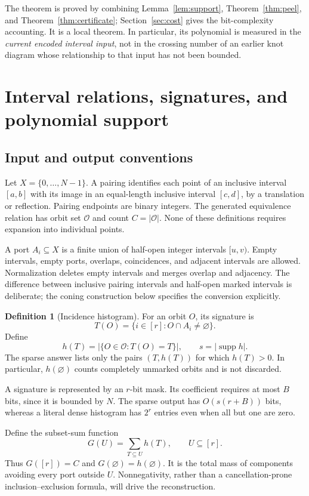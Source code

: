 \documentclass[11pt,letterpaper]{article}
\theoremstyle{definition}\newtheorem{definition}[theorem]{Definition}
\theoremstyle{remark}\newtheorem{remark}[theorem]{Remark}
\newcommand{\supp}{\operatorname{supp}}
\newcommand{\ports}{[r]}
\newcommand{\Orb}{\mathcal{O}}
\begin{document}
The theorem is proved by combining Lemma~\ref{lem:support}, Theorem~\ref{thm:peel}, and Theorem~\ref{thm:certificate}; Section~\ref{sec:cost} gives the bit-complexity accounting. It is a local theorem. In particular, its polynomial is measured in the \emph{current encoded interval input}, not in the crossing number of an earlier knot diagram whose relationship to that input has not been bounded.

\section{Interval relations, signatures, and polynomial support}
\label{sec:model}

\subsection{Input and output conventions}

Let $X=\{0,\ldots,N-1\}$. A pairing identifies each point of an inclusive interval $[a,b]$ with its image in an equal-length inclusive interval $[c,d]$, by a translation or reflection. Pairing endpoints are binary integers. The generated equivalence relation has orbit set $\Orb$ and count $C=|\Orb|$. None of these definitions requires expansion into individual points.

A port $A_i\subseteq X$ is a finite union of half-open integer intervals $[u,v)$. Empty intervals, empty ports, overlaps, coincidences, and adjacent intervals are allowed. Normalization deletes empty intervals and merges overlap and adjacency. The difference between inclusive pairing intervals and half-open marked intervals is deliberate; the coning construction below specifies the conversion explicitly.

\begin{definition}[Incidence histogram]
For an orbit $O$, its signature is
\[
T(O)=\{i\in\ports:O\cap A_i\ne\varnothing\}.
\]
Define
\[
h(T)=|\{O\in\Orb:T(O)=T\}|,\qquad
s=|\supp h|.
\]
The sparse answer lists only the pairs $(T,h(T))$ for which $h(T)>0$. In particular, $h(\varnothing)$ counts completely unmarked orbits and is not discarded.
\end{definition}

A signature is represented by an $r$-bit mask. Its coefficient requires at most $B$ bits, since it is bounded by $N$. The sparse output has $O(s(r+B))$ bits, whereas a literal dense histogram has $2^r$ entries even when all but one are zero.

Define the subset-sum function
\begin{equation}
G(U)=\sum_{T\subseteq U}h(T),\qquad U\subseteq\ports.
\label{eq:zeta}
\end{equation}
Thus $G(\ports)=C$ and $G(\varnothing)=h(\varnothing)$. It is the total mass of components avoiding every port outside $U$. Nonnegativity, rather than a cancellation-prone inclusion--exclusion formula, will drive the reconstruction.
\end{document}
